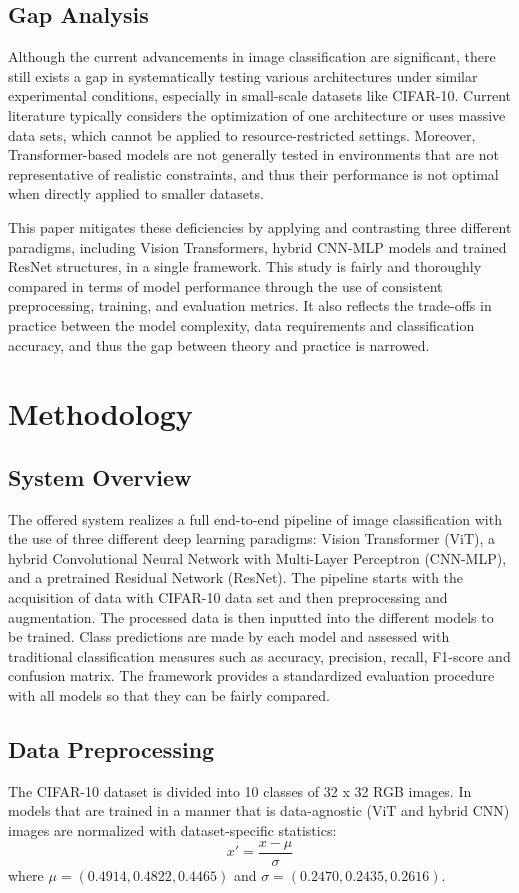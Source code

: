 \documentclass[conference]{IEEEtran}
\begin{document}
\subsection{Gap Analysis}
Although the current advancements in image classification are significant, there still exists a gap in systematically testing various architectures under similar experimental conditions, especially in small-scale datasets like CIFAR-10. Current literature typically considers the optimization of one architecture or uses massive data sets, which cannot be applied to resource-restricted settings. Moreover, Transformer-based models are not generally tested in environments that are not representative of realistic constraints, and thus their performance is not optimal when directly applied to smaller datasets.

This paper mitigates these deficiencies by applying and contrasting three different paradigms, including Vision Transformers, hybrid CNN-MLP models and trained ResNet structures, in a single framework. This study is fairly and thoroughly compared in terms of model performance through the use of consistent preprocessing, training, and evaluation metrics. It also reflects the trade-offs in practice between the model complexity, data requirements and classification accuracy, and thus the gap between theory and practice is narrowed.
\section{Methodology}

\subsection{System Overview}
The offered system realizes a full end-to-end pipeline of image classification with the use of three different deep learning paradigms: Vision Transformer (ViT), a hybrid Convolutional Neural Network with Multi-Layer Perceptron (CNN-MLP), and a pretrained Residual Network (ResNet). The pipeline starts with the acquisition of data with CIFAR-10 data set and then preprocessing and augmentation. The processed data is then inputted into the different models to be trained. Class predictions are made by each model and assessed with traditional classification measures such as accuracy, precision, recall, F1-score and confusion matrix. The framework provides a standardized evaluation procedure with all models so that they can be fairly compared.

\subsection{Data Preprocessing}
The CIFAR-10 dataset is divided into 10 classes of 32 x 32 RGB images. In models that are trained in a manner that is data-agnostic (ViT and hybrid CNN) images are normalized with dataset-specific statistics:
\[
x' = \frac{x - \mu}{\sigma}
\]
where $\mu = (0.4914, 0.4822, 0.4465)$ and $\sigma = (0.2470, 0.2435, 0.2616)$.
\end{document}
